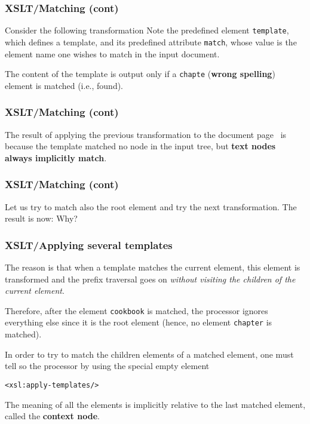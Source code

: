 %
\begin{frame}
\frametitle{XSLT/Matching (cont)}

Consider the following \XSLT transformation
Note the \XSLT predefined element \texttt{template}, which defines a
template, and its predefined attribute \texttt{match}, whose value is
the element name one wishes to match in the input \XML document.

The content of the template is output only if a \texttt{chapte}
(\textbf{wrong spelling}) element is matched (i.e., found).

\end{frame}

%
\begin{frame}
\frametitle{XSLT/Matching (cont)}

The result of applying the previous transformation to the document
page~\pageref{cookbook.xml} is 
because the template matched no node in the input tree, but
\textbf{text nodes always implicitly match}.

\end{frame}

%
\begin{frame}
\frametitle{XSLT/Matching (cont)}
\label{chapters.xsl}

Let us try to match also the root element and try the next
transformation.
The result is now:
Why?

\end{frame}

%
\begin{frame}[containsverbatim]
\frametitle{XSLT/Applying several templates}

The reason is that when a template matches the current element, this
element is transformed and the prefix traversal goes on \emph{without
  visiting the children of the current element}.

\bigskip

Therefore, after the element \texttt{cookbook} is matched, the \XSLT
processor ignores everything else since it is the root element
(hence, no element \texttt{chapter} is matched).

\bigskip

In order to try to match the children elements of a matched element,
one must tell so the processor by using the special empty element
{\small
\begin{verbatim}
<xsl:apply-templates/>
\end{verbatim}
} 
The meaning of all the \XSLT elements is implicitly relative to the
last matched element, called the \textbf{context node}.

\end{frame}

